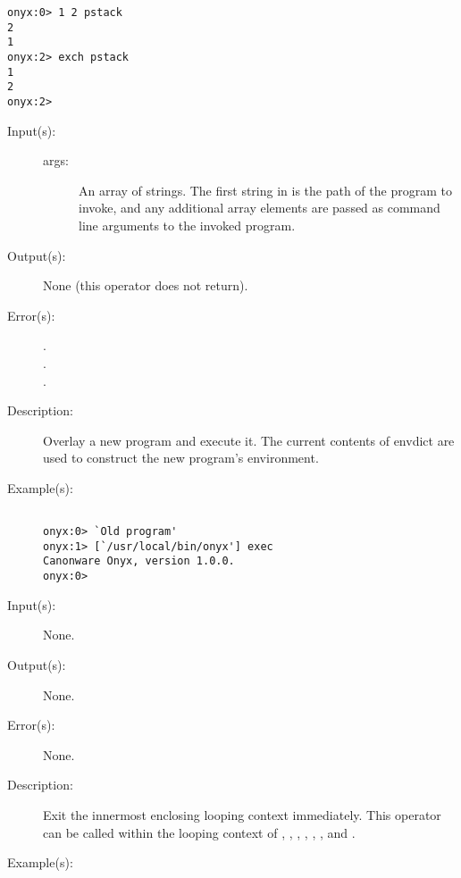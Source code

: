 \begin{description}
\begin{description}
\begin{verbatim}
onyx:0> 1 2 pstack
2
1
onyx:2> exch pstack
1
2
onyx:2>
		\end{verbatim}
	\end{description}
\label{systemdict:exec}
\item[{\onyxop{args}{exec}{--}}: ]
	\begin{description}\item[]
	\item[Input(s): ]
		\begin{description}\item[]
		\item[args: ]
			An array of strings.  The first string in 
			is the path of the program to invoke, and any additional
			array elements are passed as command line arguments to
			the invoked program.
		\end{description}
	\item[Output(s): ] None (this operator does not return).
	\item[Error(s): ]
		\begin{description}\item[]
		\item[.]
		\item[.]
		\item[.]
		\end{description}
	\item[Description: ]
		Overlay a new program and execute it.  The current contents of
		envdict are used to construct the new program's environment.
	\item[Example(s): ]\begin{verbatim}

onyx:0> `Old program'
onyx:1> [`/usr/local/bin/onyx'] exec
Canonware Onyx, version 1.0.0.
onyx:0>
		\end{verbatim}
	\end{description}
\label{systemdict:exit}
\item[{\onyxop{--}{exit}{--}}: ]
	\begin{description}\item[]
	\item[Input(s): ] None.
	\item[Output(s): ] None.
	\item[Error(s): ] None.
	\item[Description: ]
		Exit the innermost enclosing looping context immediately.
		This operator can be called within the looping context of
		,
		,
		,
		,
		,
		, and
		.
	\item[Example(s): ]\begin{verbatim}


\end{verbatim}
\end{description}
\end{description}
